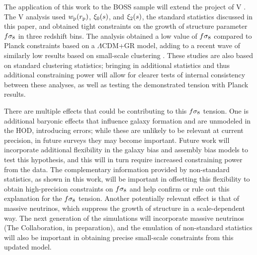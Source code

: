 The application of this work to the BOSS sample will extend the project of \aemulus V \citep{Zhai2022}.
The \aemulus V analysis used $w_\mathrm{p}(r_\mathrm{p})$, $\xi_0(s)$, and $\xi_2(s)$, the standard statistics discussed in this paper, and obtained tight constraints on the growth of structure parameter $f\sigma_8 $ in three redshift bins.
The analysis obtained a low value of $f\sigma_8 $ compared to Planck constraints based on a $\Lambda$CDM+GR model, adding to a recent wave of similarly low results based on small-scale clustering \citep{Chapman2021, Lange2022, Yuan2022}.
These studies are also based on standard clustering statistics; bringing in additional statistics and thus additional constraining power will allow for clearer tests of internal consistency between these analyses, as well as testing the demonstrated tension with Planck results.

There are multiple effects that could be contributing to this $f\sigma_8 $ tension.
One is additional baryonic effects that influence galaxy formation and are unmodeled in the HOD, introducing errors; while these are unlikely to be relevant at current precision, in future surveys they may become important.
Future work will incorporate additional flexibility in the galaxy bias and assembly bias models to test this hypothesis, and this will in turn require increased constraining power from the data.
The complementary information provided by non-standard statistics, as shown in this work, will be important in offsetting this flexibility to obtain high-precision constraints on $f\sigma_8 $ and help confirm or rule out this explanation for the $f\sigma_8 $ tension.
Another potentially relevant effect is that of massive neutrinos, which suppress the growth of structure in a scale-dependent way.
The next generation of the \aemulus simulations will incorporate massive neutrinos (The \aemulus Collaboration, in preparation), and the emulation of non-standard statistics will also be important in obtaining precise small-scale constraints from this updated model.

